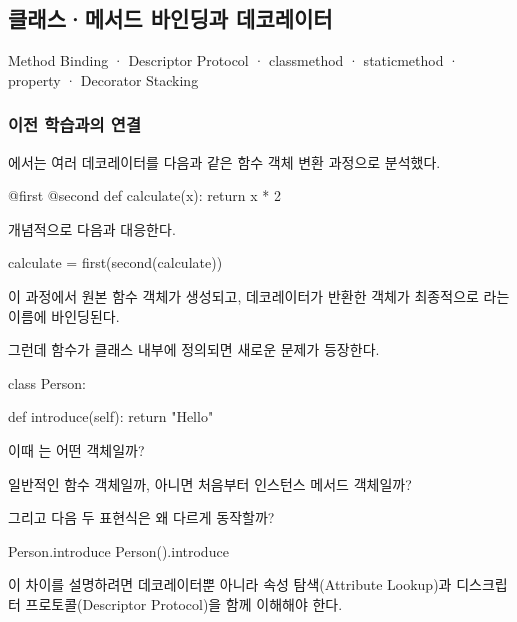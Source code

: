 

\subsection{클래스·메서드 바인딩과 데코레이터}

Method Binding · Descriptor Protocol · classmethod · staticmethod · property · Decorator Stacking

\subsubsection{이전 학습과의 연결}

에서는 여러 데코레이터를 다음과 같은 함수 객체 변환 과정으로 분석했다.

\begin{dhkcode}
@first
@second
def calculate(x):
    return x * 2
\end{dhkcode}

개념적으로 다음과 대응한다.

\begin{dhkcode}
calculate = first(second(calculate))
\end{dhkcode}

이 과정에서 원본 함수 객체가 생성되고, 데코레이터가 반환한 객체가 최종적으로 라는 이름에 바인딩된다.

그런데 함수가 클래스 내부에 정의되면 새로운 문제가 등장한다.

\begin{dhkcode}
class Person:

    def introduce(self):
        return "Hello"
\end{dhkcode}

이때 는 어떤 객체일까?

일반적인 함수 객체일까, 아니면 처음부터 인스턴스 메서드 객체일까?

그리고 다음 두 표현식은 왜 다르게 동작할까?

\begin{dhkcode}
Person.introduce
Person().introduce
\end{dhkcode}

이 차이를 설명하려면 데코레이터뿐 아니라 속성 탐색(Attribute Lookup)과 디스크립터 프로토콜(Descriptor Protocol)을 함께 이해해야 한다.

